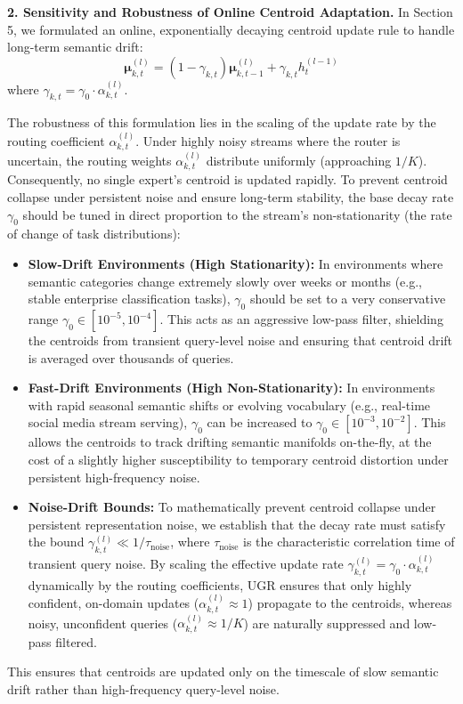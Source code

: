 \documentclass{article}
\theoremstyle{plain}
\theoremstyle{definition}
\theoremstyle{remark}
\begin{document}
\textbf{2. Sensitivity and Robustness of Online Centroid Adaptation.}
In Section 5, we formulated an online, exponentially decaying centroid update rule to handle long-term semantic drift:
\begin{equation}
\boldsymbol{\mu}_{k, t}^{(l)} = (1 - \gamma_{k,t})\boldsymbol{\mu}_{k, t-1}^{(l)} + \gamma_{k,t} h_t^{(l-1)}
\end{equation}
where $\gamma_{k,t} = \gamma_0 \cdot \alpha_{k, t}^{(l)}$. 

The robustness of this formulation lies in the scaling of the update rate by the routing coefficient $\alpha_{k, t}^{(l)}$. Under highly noisy streams where the router is uncertain, the routing weights $\alpha_{k, t}^{(l)}$ distribute uniformly (approaching $1/K$). Consequently, no single expert's centroid is updated rapidly. To prevent centroid collapse under persistent noise and ensure long-term stability, the base decay rate $\gamma_0$ should be tuned in direct proportion to the stream's non-stationarity (the rate of change of task distributions):
\begin{itemize}
    \item \textbf{Slow-Drift Environments (High Stationarity):} In environments where semantic categories change extremely slowly over weeks or months (e.g., stable enterprise classification tasks), $\gamma_0$ should be set to a very conservative range $\gamma_0 \in [10^{-5}, 10^{-4}]$. This acts as an aggressive low-pass filter, shielding the centroids from transient query-level noise and ensuring that centroid drift is averaged over thousands of queries.
    \item \textbf{Fast-Drift Environments (High Non-Stationarity):} In environments with rapid seasonal semantic shifts or evolving vocabulary (e.g., real-time social media stream serving), $\gamma_0$ can be increased to $\gamma_0 \in [10^{-3}, 10^{-2}]$. This allows the centroids to track drifting semantic manifolds on-the-fly, at the cost of a slightly higher susceptibility to temporary centroid distortion under persistent high-frequency noise.
    \item \textbf{Noise-Drift Bounds:} To mathematically prevent centroid collapse under persistent representation noise, we establish that the decay rate must satisfy the bound $\gamma_{k, t}^{(l)} \ll 1 / \tau_{\text{noise}}$, where $\tau_{\text{noise}}$ is the characteristic correlation time of transient query noise. By scaling the effective update rate $\gamma_{k, t}^{(l)} = \gamma_0 \cdot \alpha_{k, t}^{(l)}$ dynamically by the routing coefficients, UGR ensures that only highly confident, on-domain updates ($\alpha_{k, t}^{(l)} \approx 1$) propagate to the centroids, whereas noisy, unconfident queries ($\alpha_{k, t}^{(l)} \approx 1/K$) are naturally suppressed and low-pass filtered.
\end{itemize} This ensures that centroids are updated only on the timescale of slow semantic drift rather than high-frequency query-level noise.
\end{document}
